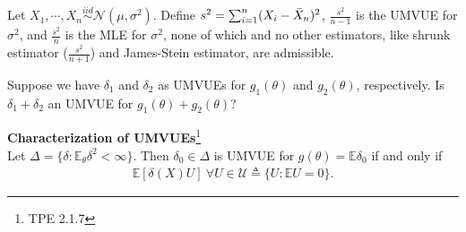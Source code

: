 Let $X_1,\cdots,X_n\overset{iid}{\sim}\mathcal{N}(\mu,\sigma^2)$. 
Define $s^2=\sum_{i=1}^n(X_i-\Bar{X}_n)^2$,
$\frac{s^2}{n-1}$ is the UMVUE for $\sigma^2$, and
$\frac{s^2}{n}$ is the MLE for $\sigma^2$, 
none of which and no other estimators, 
like shrunk estimator ($\frac{s^2}{n+1}$) and James-Stein estimator,
are admissible.

\begin{question}
    Suppose we have $\delta_1$ and $\delta_2$ as UMVUEs for $g_1(\theta)$ and $g_2(\theta)$, respectively.
    Is $\delta_1 + \delta_2$ an UMVUE for $g_1(\theta)+g_2(\theta)$?
\end{question}

\begin{theorem}
    \textbf{Characterization of UMVUEs}\footnote{TPE 2.1.7}\\
    Let $\Delta=\{\delta:\mathbb{E}_\theta\delta^2<\infty\}$. 
    Then $\delta_0\in\Delta$ is UMVUE for $g(\theta)=\mathbb{E}\delta_0$
    if and only if 
    \begin{gather}
        \mathbb{E}[\delta(X)U]~\forall{U}\in\mathcal{U}\triangleq\{U:\mathbb{E}U=0\}.
    \end{gather}
\end{theorem}
